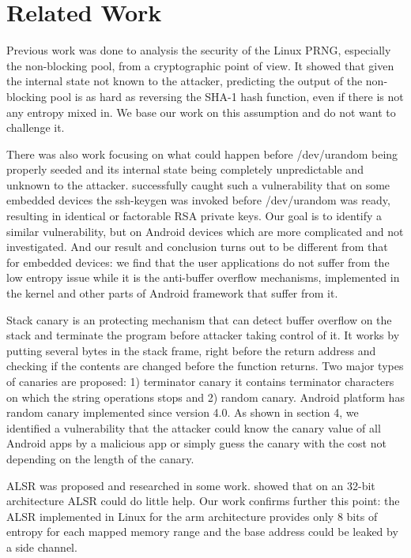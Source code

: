 \section{Related Work}


Previous work was done to analysis the security of the Linux PRNG, especially the non-blocking pool, \cite{Gutterman06} from a cryptographic point of view. It showed that given the internal state not known to the attacker, predicting the output of the non-blocking pool is as hard as reversing the SHA-1 hash function, even if there is not any entropy mixed in. We base our work on this assumption and do not want to challenge it. 

There was also work focusing on what could happen before /dev/urandom being properly seeded and its internal state being completely unpredictable and unknown to the attacker. \cite{weakkeys12} successfully caught such a vulnerability that on some embedded devices the ssh-keygen was invoked before /dev/urandom was ready, resulting in identical or factorable RSA private keys. Our goal is to identify a similar vulnerability, but on Android devices which are more complicated and not investigated. And our result and conclusion turns out to be different from that for embedded devices: we find that the user applications do not suffer from the low entropy issue while it is the anti-buffer overflow mechanisms, implemented in the kernel and other parts of Android framework that suffer from it.

Stack canary \cite{Cowan98} is an protecting mechanism that can detect buffer overflow on the stack and terminate the program before attacker taking control of it. It works by putting several bytes in the stack frame, right before the return address and checking if the contents are changed before the function returns. Two major types of canaries are proposed: 1) terminator canary it contains terminator characters on which the string operations stops and 2) random canary. Android platform has random canary implemented since version 4.0. As shown in section 4, we identified a vulnerability that the attacker could know the canary value of all Android apps by a malicious app or simply guess the canary with the cost not depending on the length of the canary.

ALSR was proposed and researched in some work. \cite{Shacham04} showed that on an 32-bit architecture ALSR could do little help. Our work confirms further this point: the ALSR implemented in Linux for the arm architecture provides only 8 bits of entropy for each mapped memory range and the base address could be leaked by a side channel.


